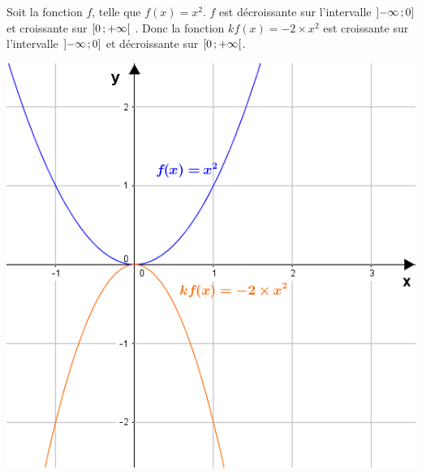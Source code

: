 \documentclass[12pt,a4paper]{article}
\begin{document}
	\begin{myex}	
		
		\begin{multicols}{2}
			\vspace*{15mm}
			
			Soit la fonction $f$, telle que $f(x) = x^2$.
			$f$ est décroissante sur l'intervalle $\mbox{\ensuremath{\left]-\infty\mathpunct{};0\right]}} $ et croissante sur $\mbox{\ensuremath{\left[0\mathpunct{};+\infty\right[}}$ .
			Donc la fonction $kf(x) = -2 \times x^2$ est croissante sur l'intervalle $\mbox{\ensuremath{\left]-\infty\mathpunct{};0\right]}} $ et décroissante sur $\mbox{\ensuremath{\left[0\mathpunct{};+\infty\right[}}$.
			
			\includegraphics[scale=0.65]{./img/kf2}
		\end{multicols}
	\end{myex}
	
\end{document}
